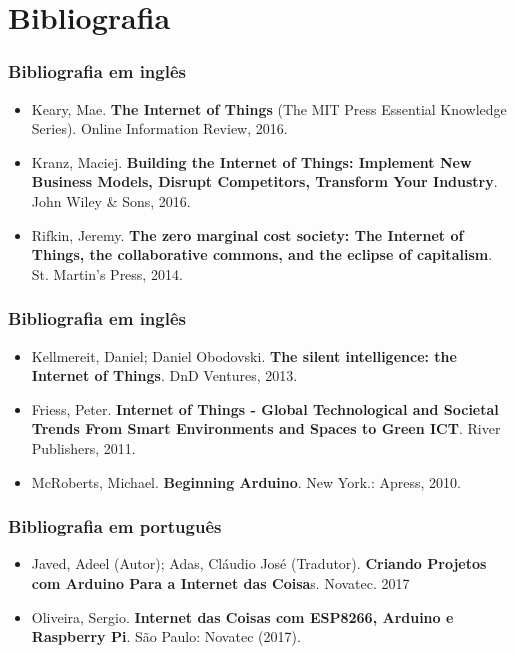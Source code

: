 \documentclass{beamer}
\begin{document}
\section{Bibliografia}

\begin{frame}
\frametitle{Bibliografia em inglês}
\begin{itemize}
	\item Keary, Mae. \textbf{The Internet of Things} (The MIT Press Essential Knowledge Series). Online Information Review, 2016.
	
	\item Kranz, Maciej. \textbf{Building the Internet of Things: Implement New Business Models, Disrupt Competitors, Transform Your Industry}. John Wiley \& Sons, 2016.
	
	\item Rifkin, Jeremy. \textbf{The zero marginal cost society: The Internet of Things, the collaborative commons, and the eclipse of capitalism}. St. Martin's Press, 2014.
\end{itemize}
\end{frame}

\begin{frame}
\frametitle{Bibliografia em inglês}
\begin{itemize}
\item Kellmereit, Daniel; Daniel Obodovski. \textbf{The silent intelligence: the Internet of Things}. DnD Ventures, 2013.

\item Friess, Peter. \textbf{Internet of Things - Global Technological and Societal Trends From Smart Environments and Spaces to Green ICT}. River Publishers, 2011.

\item McRoberts, Michael. \textbf{Beginning Arduino}. New York.: Apress, 2010.
\end{itemize}
\end{frame}

\begin{frame}
\frametitle{Bibliografia em português}
	\begin{itemize}		
		\item Javed, Adeel (Autor); Adas, Cláudio José (Tradutor). \textbf{Criando Projetos com Arduino Para a Internet das Coisa}s. Novatec. 2017
		
		\item Oliveira, Sergio. \textbf{Internet das Coisas com ESP8266, Arduino e Raspberry Pi}. São Paulo: Novatec (2017).
	\end{itemize}
\end{frame}
\end{document}
